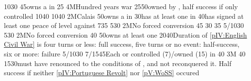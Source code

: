 
%
%
{10}{30}{\EUobjEcosseVassal}%
%
%
{}{45}{\paysmajeurAngleterre owns a \Presidio in \provincePicardie}%
%
%
{}{25}{}%
%
\EUobjective4M{Hundred years war}{}%
{25}{50}{\provinceGuyenne owned by \paysmajeurAngleterre, half success if only
  controlled}%
%
%
{10}{40}{\EUobjIrelandPacified}%
%
%
%
{10}{40}{\EUobjEcosseVassal}%
%
\EUobjective2M{Calais}{}%
{}{50}{\paysmajeurAngleterre owns a \Presidio in \provincePicardie}%
%
%
{}{30}{\paysmajeurAngleterre has at least one \COL in \continentAmerica}%
%
%
{}{40}{\paysmajeurAngleterre has signed at least one peace of level  against \paysmajeurFrance}%
%
%
{7}{35}{\EUobjIrelandPacified}%
%
%
%
{5}{30}{\EUobjEcosseVassal}%
%
\EUobjective2M{No forced conversion}{}%
{}{45}{\EUobjNoConversion{\paysmajeurAngleterre}}%
%
%
{}{30}{}%
%
%
%
{}{35}{\EUobjNoConversion{\HOL}}%
%
%
{5/10}{30}{}%
%
%
%
{5}{30}{\EUobjEcosseVassal}%
%
\EUobjective2M{No forced conversion}{}%
{}{40}{\EUobjNoConversion{\paysmajeurAngleterre}}%
%
%
{}{50}{\paysmajeurAngleterre owns at least one }%
%
%
{20}{40}{Duration of \ref{pIV:English Civil War} is four turns or less: full
  success, five turns or no event: half-success, six or more: failure}%
%
%
{5/10}{30}{}%
%
%
%
{7/15}{45}{Each \TP or \COL controlled (7)/owned (15) in \continentCaraibes}%
%
%
{}{40}{\EUobjNoConversion{\paysmajeurAngleterre}}%
%
\EUobjective3M{}{}%
{}{40}{}%
%
%
{15}{30}{\HIS must have renounced to the conditions of , and not reconquered it. Half success if neither
  \ref{pIV:Portuguese Revolt} nor \ref{pV:WoSS} occured}%
